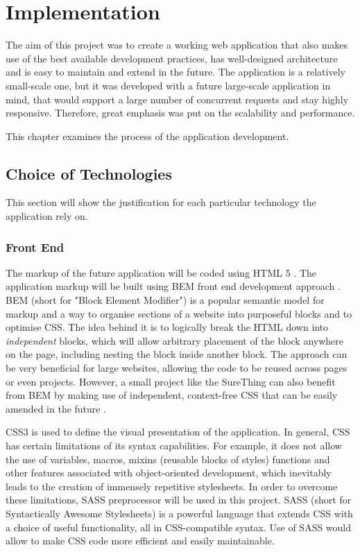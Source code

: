 \chapter{Implementation}
\label{ch:implementation}
The aim of this project was to create a working web application that also makes use of the best available development practices, has well-designed architecture and is easy to maintain and extend in the future. The application is a relatively small-scale one, but it was developed with a future large-scale application in mind, that would support a large number of concurrent requests and stay highly responsive. Therefore, great emphasis was put on the scalability and performance.  

This chapter examines the process of the application development. 

\section{Choice of Technologies}
\label{sec:choiceoftechnologies}
This section will show the justification for each particular technology the application rely on.

\subsection{Front End}
\label{subsec:frontend}
The markup of the future application will be coded using HTML 5 \citep{documentation:HTML}. The application markup will be built using BEM front end development approach \citep{documentation:BEM}. BEM (short for "Block Element Modifier") is a popular semantic model for markup and a way to organise sections of a website into purposeful blocks and to optimise CSS. The idea behind it is to logically break the HTML down into \emph{independent} blocks, which will allow arbitrary placement of the block anywhere on the page, including nesting the block inside another block. The approach can be  very beneficial for large websites, allowing the code to be reused across pages or even projects. However, a small project like the SureThing can also benefit from BEM by making use of independent, context-free CSS that can be easily amended in the future \citep{article:BEMForSmallProjects}.

CSS3 is used to define the visual presentation of the application. In general, CSS has certain limitations of its syntax capabilities. For example, it does not allow the use of variables, macros, mixins (reusable blocks of styles) functions and other features associated with object-oriented development, which inevitably leads to the creation of immensely repetitive stylesheets. In order to overcome these limitations, SASS preprocessor \citep{documentation:sass} will be used in this project. SASS (short for Syntactically Awesome Stylesheets) is a powerful language that extends CSS with a choice of useful functionality, all in CSS-compatible syntax. Use of SASS would allow to make CSS code more efficient and easily maintainable. 

